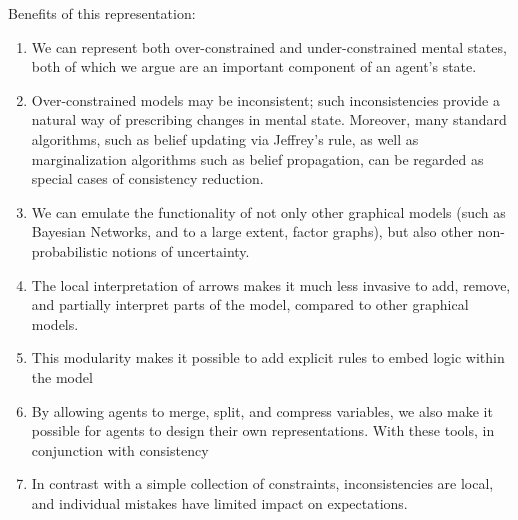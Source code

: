 \documentclass{article}
\begin{document}
	Benefits of this representation:
	\begin{enumerate}[nosep]
		\item We can represent both over-constrained and under-constrained mental states, both of which we argue are an important component of an agent's state.
		\item Over-constrained models may be inconsistent; such inconsistencies provide a natural way of prescribing changes in mental state. Moreover, many standard algorithms, such as belief updating via Jeffrey's rule, as well as marginalization algorithms such as belief propagation, can be regarded as special cases of consistency reduction.
		\item We can emulate the functionality of not only other graphical models (such as Bayesian Networks, and to a large extent, factor graphs), but also other non-probabilistic notions of uncertainty.
		\item The local interpretation of arrows makes it much less invasive to add, remove, and partially interpret parts of the model, compared to other graphical models.
		\item This modularity makes it possible to add explicit rules to embed logic within the model
		\item By allowing agents to merge, split, and compress variables, we also make it possible for agents to design their own representations. With these tools, in conjunction with consistency
		\item In contrast with a simple collection of constraints, inconsistencies are local, and individual mistakes have limited impact on expectations.
	\end{enumerate} %


\end{document}
